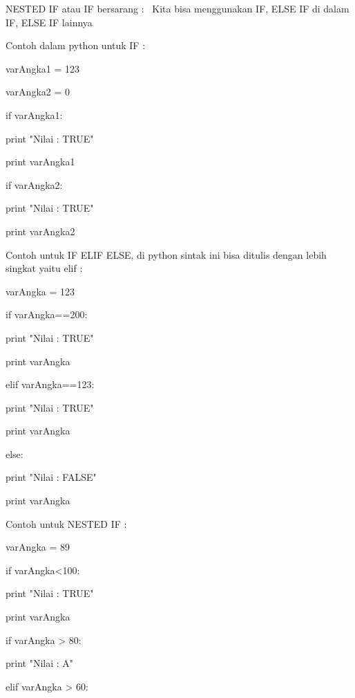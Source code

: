  
NESTED IF atau IF bersarang :~ Kita bisa menggunakan IF, ELSE IF di dalam IF, ELSE IF lainnya 

 
Contoh dalam python untuk IF :  

 
varAngka1 = 123 

 
varAngka2 = 0 

 
if varAngka1: 

 
                                                print "Nilai : TRUE" 

 
                                                print varAngka1 

 
if varAngka2: 

 
                                                print "Nilai : TRUE" 

 
                                                print varAngka2{\fontsize{14pt}{14pt}\selectfont     \\} 

 
Contoh untuk IF ELIF ELSE, di python sintak ini bisa ditulis dengan lebih singkat yaitu elif :  

 
varAngka = 123 
 
    
 
if varAngka==200: 

 
                           print "Nilai : TRUE" 

 
                           print varAngka 

 
elif varAngka==123: 

 
                           print "Nilai : TRUE" 

 
                           print varAngka 

 
else: 

 
                           print "Nilai : FALSE" 

 
                           print varAngka 

 
Contoh untuk NESTED IF :  

 
varAngka = 89 
 
    
 
if varAngka<100: 

 
                       print "Nilai : TRUE" 

 
                       print varAngka 

 
                       if varAngka > 80: 

 
                                                print "Nilai : A" 

 
                       elif varAngka > 60: 

